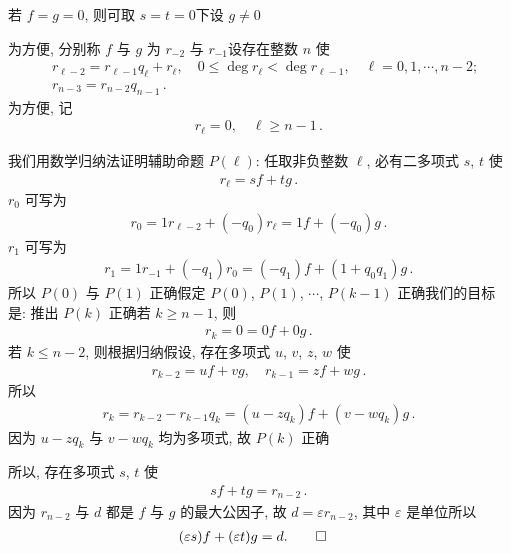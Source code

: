\begin{pf}
    若 $f=g=0$, 则可取 $s=t=0$\period 下设 $g \neq 0$\period

    为方便, 分别称 $f$ 与 $g$ 为 $r_{-2}$ 与 $r_{-1}$\period 设存在整数 $n$ 使
    \begin{align*}
         & r_{\ell - 2} = r_{\ell - 1} q_{\ell} + r_{\ell}, \quad 0 \leq \deg r_{\ell} < \deg r_{\ell - 1}, \quad \ell = 0,1,\cdots,n-2; \\
         & r_{n - 3} = r_{n - 2} q_{n - 1} \period
    \end{align*}
    为方便, 记
    \begin{align*}
        r_{\ell} = 0, \quad \ell \geq n - 1 \period
    \end{align*}

    我们用数学归纳法证明辅助命题 $P(\ell)$: 任取非负整数 $\ell$, 必有二多项式 $s$, $t$ 使
    \begin{align*}
        r_\ell = sf + tg \period
    \end{align*}
    $r_0$ 可写为
    \begin{align*}
        r_0 = 1 r_{\ell - 2} + (-q_0) r_{\ell} = 1f + (-q_0)g \period
    \end{align*}
    $r_1$ 可写为
    \begin{align*}
        r_1 = 1r_{-1} + (-q_1) r_0 = (-q_1) f + (1 + q_0 q_1) g \period
    \end{align*}
    所以 $P(0)$ 与 $P(1)$ 正确\period 假定 $P(0)$, $P(1)$, $\cdots$, $P(k-1)$ 正确\period 我们的目标是: 推出 $P(k)$ 正确\period 若 $k \geq n-1$, 则
    \begin{align*}
        r_k = 0 = 0f + 0g \period
    \end{align*}
    若 $k \leq n-2$, 则根据归纳假设, 存在多项式 $u$, $v$, $z$, $w$ 使
    \begin{align*}
        r_{k-2} = uf + vg, \quad r_{k-1} = zf + wg \period
    \end{align*}
    所以
    \begin{align*}
        r_{k} = r_{k-2} - r_{k-1} q_k = (u - zq_k) f + (v - wq_k) g \period
    \end{align*}
    因为 $u - zq_k$ 与 $v - wq_k$ 均为多项式, 故 $P(k)$ 正确\period

    所以, 存在多项式 $s$, $t$ 使
    \begin{align*}
        sf + tg = r_{n-2} \period
    \end{align*}
    因为 $r_{n-2}$ 与 $d$ 都是 $f$ 与 $g$ 的最大公因子, 故 $d = \varepsilon r_{n-2}$, 其中 $\varepsilon$ 是单位\period 所以
    \begin{align*}
         & (\varepsilon s)f + (\varepsilon t)g = d . \qedhere
    \end{align*}
\end{pf}

